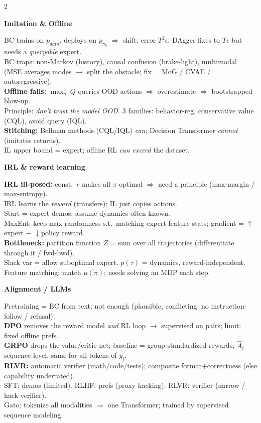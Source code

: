 \documentclass[a4paper]{article}
\newcommand{\hd}[1]{%
  \par\addvspace{3.6pt}%
  {\color{accent}\bfseries\small #1}\par
  \vspace{-4pt}{\color{accent!45}\rule{\linewidth}{0.4pt}}\par\vspace{1.2pt}}
\begin{document}
\begin{multicols}{2}
\hd{Imitation \& Offline}
BC trains on $p_{data}$, deploys on $p_{\pi_\theta}$ $\Rightarrow$ shift; error $T^2\epsilon$. DAgger fixes to $T\epsilon$ but needs a \emph{queryable} expert.\\
BC traps: non-Markov (history), causal confusion (brake-light), multimodal (MSE averages modes $\to$ split the obstacle; fix = MoG / CVAE / autoregressive).\\
\textbf{Offline fails:} $\max_{a'}Q$ queries OOD actions $\Rightarrow$ overestimate $\Rightarrow$ bootstrapped blow-up.\\
Principle: \emph{don't trust the model OOD.} 3 families: behavior-reg, conservative value (CQL), avoid query (IQL).\\
\textbf{Stitching:} Bellman methods (CQL/IQL) \emph{can}; Decision Transformer \emph{cannot} (imitates returns).\\
IL upper bound = expert; offline RL \emph{can exceed} the dataset.

\hd{IRL \& reward learning}
\textbf{IRL ill-posed:} const.\ $r$ makes all $\pi$ optimal $\Rightarrow$ need a principle (max-margin / max-entropy).\\
IRL learns the \emph{reward} (transfers); IL just copies actions.\\
Start = expert demos; assume dynamics often known.\\
MaxEnt: keep max randomness s.t.\ matching expert feature stats; gradient = $\uparrow$expert $-$ $\downarrow$policy reward.\\
\textbf{Bottleneck:} partition function $Z$ = sum over all trajectories (differentiate through it / fwd-bwd).\\
Slack var = allow suboptimal expert. $p(\tau)$ = dynamics, reward-independent.\\
Feature matching: match $\mu(\pi)$; needs solving an MDP each step.

\hd{Alignment / LLMs}
Pretraining = BC from text; not enough (plausible, conflicting; no instruction-follow / refusal).\\
\textbf{DPO} removes the reward model \emph{and} RL loop $\to$ supervised on pairs; limit: fixed offline prefs.\\
\textbf{GRPO} drops the value/critic net; baseline = group-standardized rewards; $\hat A_i$ sequence-level, same for all tokens of $y_i$.\\
\textbf{RLVR:} automatic verifier (math/code/tests); composite format+correctness (else capability underrated).\\
SFT: demos (limited). RLHF: prefs (proxy hacking). RLVR: verifier (narrow / hack verifier).\\
Gato: tokenize all modalities $\Rightarrow$ one Transformer; trained by supervised sequence modeling.


\end{multicols}
\end{document}
